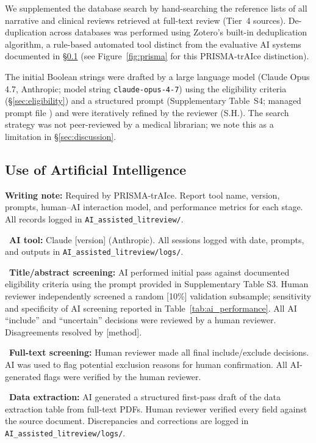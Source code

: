 \documentclass[11pt,a4paper]{article}
\newcommand{\todoitem}[1]{\textcolor{blue!70!black}{\textbullet~#1}}
\newcommand{\writingnote}[1]{\par\noindent\colorbox{yellow!30}{\parbox{\dimexpr\linewidth-2\fboxsep}{%
  \small\textbf{Writing note:} #1}}\par\medskip}
\begin{document}
We supplemented the database search by hand-searching the reference
lists of all narrative and clinical reviews retrieved at full-text
review (Tier~4 sources). De-duplication across databases was
performed using Zotero's built-in deduplication algorithm, a
rule-based automated tool distinct from the evaluative AI systems
documented in §\ref{sec:ai_use} (see Figure~\ref{fig:prisma} for this
PRISMA-trAIce distinction).

The initial Boolean strings were drafted by a large language model
(Claude Opus 4.7, Anthropic; model string \texttt{claude-opus-4-7})
using the eligibility criteria (§\ref{sec:eligibility}) and a
structured prompt (Supplementary Table~S4; managed prompt file
) and were
iteratively refined by the reviewer (S.H.). The search strategy was
not peer-reviewed by a medical librarian; we note this as a
limitation in §\ref{sec:discussion}.

\subsection{Use of Artificial Intelligence}
\label{sec:ai_use}

\writingnote{Required by PRISMA-trAIce. Report tool name, version, prompts, human--AI interaction model, and performance metrics for each stage. All records logged in \texttt{AI\_assisted\_litreview/}.}

\todoitem{\textbf{AI tool:} Claude [version] (Anthropic). All sessions logged with date, prompts, and outputs in \texttt{AI\_assisted\_litreview/logs/}.}

\todoitem{\textbf{Title/abstract screening:} AI performed initial pass against documented eligibility criteria using the prompt provided in Supplementary Table S3. Human reviewer independently screened a random [10\%] validation subsample; sensitivity and specificity of AI screening reported in Table~\ref{tab:ai_performance}. All AI ``include'' and ``uncertain'' decisions were reviewed by a human reviewer. Disagreements resolved by [method].}

\todoitem{\textbf{Full-text screening:} Human reviewer made all final include/exclude decisions. AI was used to flag potential exclusion reasons for human confirmation. All AI-generated flags were verified by the human reviewer.}

\todoitem{\textbf{Data extraction:} AI generated a structured first-pass draft of the data extraction table from full-text PDFs. Human reviewer verified every field against the source document. Discrepancies and corrections are logged in \texttt{AI\_assisted\_litreview/logs/}.}
\end{document}
